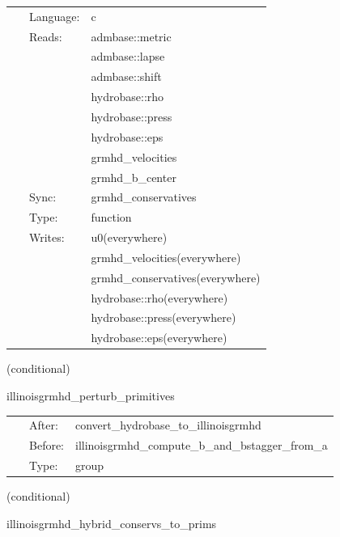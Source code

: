 \documentclass{article}
\begin{document}
 \begin{tabular*}{160mm}{cll} 
~ & Language:  & c \\ 
~ & Reads:  & admbase::metric \\ 
~& ~ &admbase::lapse\\ 
~& ~ &admbase::shift\\ 
~& ~ &hydrobase::rho\\ 
~& ~ &hydrobase::press\\ 
~& ~ &hydrobase::eps\\ 
~& ~ &grmhd\_velocities\\ 
~& ~ &grmhd\_b\_center\\ 
~ & Sync:  & grmhd\_conservatives \\ 
~ & Type:  & function \\ 
~ & Writes:  & u0(everywhere) \\ 
~& ~ &grmhd\_velocities(everywhere)\\ 
~& ~ &grmhd\_conservatives(everywhere)\\ 
~& ~ &hydrobase::rho(everywhere)\\ 
~& ~ &hydrobase::press(everywhere)\\ 
~& ~ &hydrobase::eps(everywhere)\\ 
\end{tabular*} 


\vspace{5mm}

   (conditional) 

\hspace{5mm} illinoisgrmhd\_perturb\_primitives 

\hspace{5mm}{\it perturb initial primitive data } 


\hspace{5mm}

 \begin{tabular*}{160mm}{cll} 
~ & After:  & convert\_hydrobase\_to\_illinoisgrmhd \\ 
~ & Before:  & illinoisgrmhd\_compute\_b\_and\_bstagger\_from\_a \\ 
~ & Type:  & group \\ 
\end{tabular*} 


\vspace{5mm}

   (conditional) 

\hspace{5mm} illinoisgrmhd\_hybrid\_conservs\_to\_prims 
\end{document}
